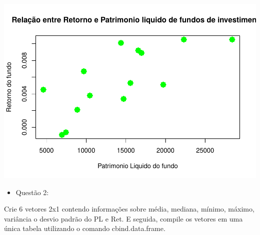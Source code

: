 \documentclass[
]{article}
\providecommand{\tightlist}{%
  \setlength{\itemsep}{0pt}\setlength{\parskip}{0pt}}
\begin{document}
\includegraphics{Aula0R_Exemplo_RMarkdwon_2020_ERE_files/figure-latex/unnamed-chunk-2-1.pdf}

\begin{itemize}
\tightlist
\item
  Questão 2:
\end{itemize}

Crie 6 vetores 2x1 contendo informações sobre média, mediana, mínimo,
máximo, variância o desvio padrão do PL e Ret. E seguida, compile os
vetores em uma única tabela utilizando o comando cbind.data.frame.
\end{document}
